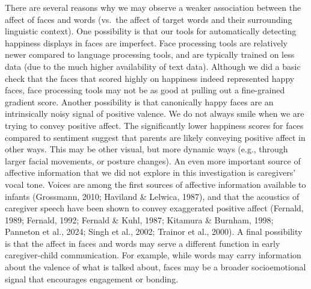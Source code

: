 \documentclass[10pt, letterpaper]{article}
\begin{document}
There are several reasons why we may observe a weaker association
between the affect of faces and words (vs.~the affect of target words
and their surrounding linguistic context). One possibility is that our
tools for automatically detecting happiness displays in faces are
imperfect. Face processing tools are relatively newer compared to
language processing tools, and are typically trained on less data (due
to the much higher availability of text data). Although we did a basic
check that the faces that scored highly on happiness indeed represented
happy faces, face processing tools may not be as good at pulling out a
fine-grained gradient score. Another possibility is that canonically
happy faces are an intrinsically noisy signal of positive valence. We do
not always smile when we are trying to convey positive affect. The
significantly lower happiness scores for faces compared to sentiment
suggest that parents are likely conveying positive affect in other ways.
This may be other visual, but more dynamic ways (e.g., through larger
facial movements, or posture changes). An even more important source of
affective information that we did not explore in this investigation is
caregivers' vocal tone. Voices are among the first sources of affective
information available to infants (Grossmann, 2010; Haviland \& Lelwica,
1987), and that the acoustics of caregiver speech have been shown to
convey exaggerated positive affect (Fernald, 1989; Fernald, 1992;
Fernald \& Kuhl, 1987; Kitamura \& Burnham, 1998; Panneton et al., 2024;
Singh et al., 2002; Trainor et al., 2000). A final possibility is that
the affect in faces and words may serve a different function in early
caregiver-child communication. For example, while words may carry
information about the valence of what is talked about, faces may be a
broader socioemotional signal that encourages engagement or bonding.
\end{document}
